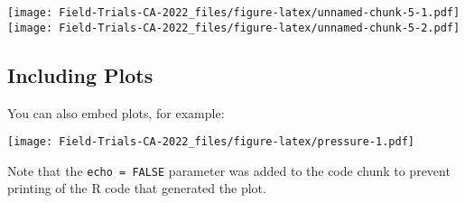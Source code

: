 \documentclass[
]{article}
\begin{document}
\texttt{[image: Field-Trials-CA-2022\_files/figure-latex/unnamed-chunk-5-1.pdf]}
\texttt{[image: Field-Trials-CA-2022\_files/figure-latex/unnamed-chunk-5-2.pdf]}

\hypertarget{including-plots}{%
\subsection{Including Plots}\label{including-plots}}

You can also embed plots, for example:

\texttt{[image: Field-Trials-CA-2022\_files/figure-latex/pressure-1.pdf]}

Note that the \texttt{echo\ =\ FALSE} parameter was added to the code
chunk to prevent printing of the R code that generated the plot.
\end{document}
